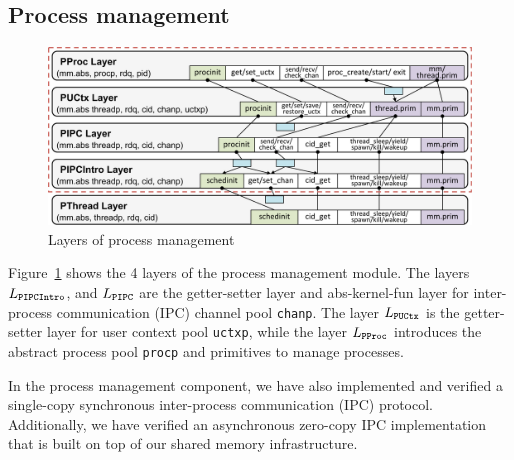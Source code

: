 \subsection{Process management}
\label{sec:base:pm} 


{
\begin{figure}\centering
\includegraphics[scale=0.6]{figs/pm_layer}	
\caption{Layers of process management }
\label{fig:base:pm:layers}
\hrulefill
\end{figure}
}
 
Figure~\ref{fig:base:pm:layers} shows the 4 layers of the process
management module.  The layers $L_{\texttt{PIPCIntro}}$, and
$L_{\texttt{PIPC}}$ are the getter-setter layer and abs-kernel-fun layer for
inter-process communication (IPC) channel pool \verb"chanp".  The
layer $L_{\texttt{PUCtx}}$ is the getter-setter layer for user context pool
\verb"uctxp", while the layer $L_{\texttt{PProc}}$ introduces
the abstract process pool \verb"procp" and primitives to manage
processes.

In the process management component, we have also implemented and verified a single-copy
synchronous inter-process communication (IPC) protocol.
Additionally, we have verified an
asynchronous zero-copy IPC implementation that is built on top of our
shared memory infrastructure.


